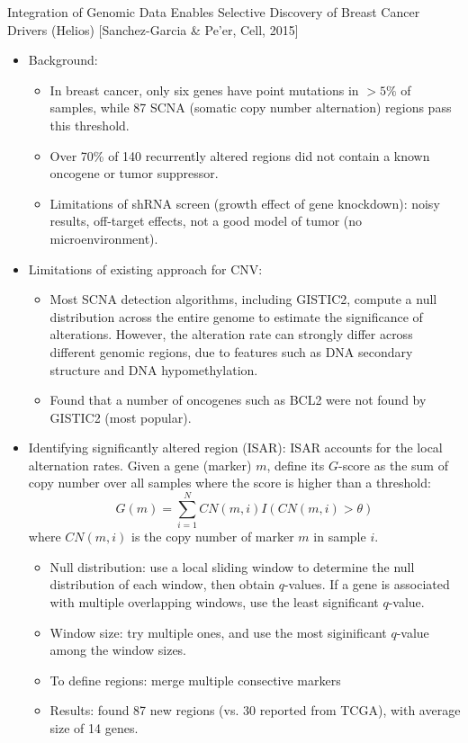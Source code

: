 \documentclass{report}
\begin{document}
Integration of Genomic Data Enables Selective Discovery of Breast Cancer Drivers (Helios) [Sanchez-Garcia \& Pe'er, Cell, 2015]	
\begin{itemize}
	\item Background: 
	\begin{itemize}
		\item In breast cancer, only six genes have point mutations in $>5\%$ of samples, while 87 SCNA (somatic copy number alternation) regions pass this threshold. 
		\item Over 70\% of 140 recurrently altered regions did not contain a known oncogene or tumor suppressor. 
		\item Limitations of shRNA screen (growth effect of gene knockdown): noisy results, off-target effects, not a good model of tumor (no microenvironment).
	\end{itemize}
	
	\item Limitations of existing approach for CNV: 
	\begin{itemize}
		\item Most SCNA detection algorithms, including GISTIC2, compute a null distribution across the entire genome to estimate the significance of alterations. However, the alteration rate can strongly differ across different genomic regions, due to features such as DNA secondary structure and DNA hypomethylation. 
		\item Found that a number of oncogenes such as BCL2 were not found by GISTIC2 (most popular). 
	\end{itemize}
	
	\item Identifying significantly altered region (ISAR): ISAR accounts for the local alternation rates. Given a gene (marker) $m$, define its $G$-score as the sum of copy number over all samples where the score is higher than a threshold: 
	\begin{equation}
	G(m) = \sum_{i=1}^N CN(m,i) I(CN(m,i)>\theta)
	\end{equation}
	where $CN(m,i)$ is the copy number of marker $m$ in sample $i$. 
	
	\begin{itemize}
		\item Null distribution: use a local sliding window to determine the null distribution of each window, then obtain $q$-values. If a gene is associated with multiple overlapping windows, use the least significant $q$-value. 
		\item Window size: try multiple ones, and use the most siginificant $q$-value among the window sizes. 
		\item To define regions: merge multiple consective markers 
		\item Results: found 87 new regions (vs. 30 reported from TCGA), with average size of 14 genes. 
	\end{itemize}
	

\end{itemize}
\end{document}
